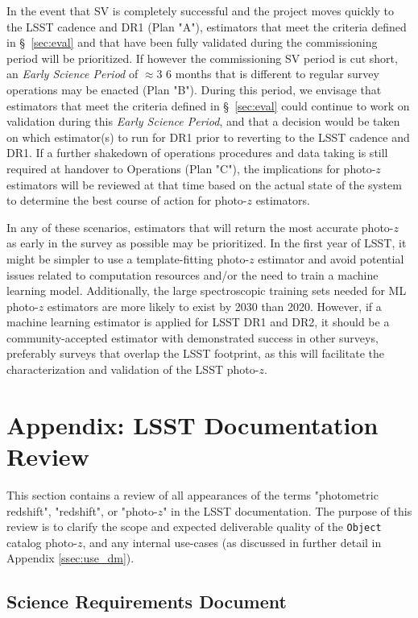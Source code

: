\documentclass[DM,lsstdraft,toc]{lsstdoc}
\begin{document}
In the event that SV is completely successful and the project moves quickly to the LSST cadence and DR1 (Plan "A"), estimators that  meet the criteria defined in \S~\ref{sec:eval} and that have been fully validated during the commissioning period will be prioritized. 
If however the commissioning SV period is cut short, an {\it Early Science Period} of $\approx$3\,\textendash\,6 months that is different to regular survey operations may be enacted (Plan "B"). During this period, we envisage that estimators that meet the criteria defined in \S~\ref{sec:eval} could continue to work on validation during this {\it Early Science Period}, and that a decision would be taken on which estimator(s) to run for DR1 prior to reverting to the LSST cadence and DR1. 
If a further shakedown of operations procedures and data taking is still required at handover to Operations (Plan "C"), the implications for photo-$z$ estimators will be reviewed at that time based on the actual state of the system to determine the best course of action for photo-$z$ estimators. 

In any of these scenarios,  estimators that will return the most accurate photo-$z$ as early in the survey as possible may be prioritized.
In the first year of LSST, it might be simpler to use a template-fitting photo-$z$ estimator and avoid potential issues related to computation resources and/or the need to train a machine learning model.
Additionally, the large spectroscopic training sets needed for ML photo-$z$ estimators are more likely to exist by 2030 than 2020.
However, if a machine learning estimator is applied for LSST DR1 and DR2, it should be a community-accepted estimator with demonstrated success in other surveys, preferably surveys that overlap the LSST footprint, as this will facilitate the characterization and validation of the LSST photo-$z$.

\section{Appendix: LSST Documentation Review}\label{sec:docs}

This section contains a review of all appearances of the terms "photometric redshift", "redshift", or "photo-$z$" in the LSST documentation.
The purpose of this review is to clarify the scope and expected deliverable quality of the {\tt Object} catalog photo-$z$, and any internal use-cases (as discussed in further detail in Appendix \ref{ssec:use_dm}).

\subsection{Science Requirements Document}\label{ssec:docs_srd}
\end{document}
